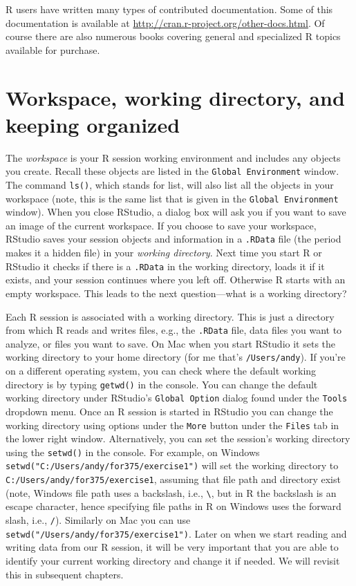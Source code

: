 R users have written many types of contributed documentation. Some of this documentation is available at \url{http://cran.r-project.org/other-docs.html}. Of course there are also numerous books covering general and specialized R topics available for purchase.

\section{Workspace, working directory, and keeping organized}

The \emph{workspace} is your R session working environment and includes any objects you create. Recall these objects are listed in the \verb+Global Environment+ window. The command \verb+ls()+, which stands for list, will also list all the objects in your workspace (note, this is the same list that is given in the \verb+Global Environment+ window). When you close RStudio, a dialog box will ask you if you want to save an image of the current workspace. If you choose to save your workspace, RStudio saves your session objects and information in a \verb+.RData+ file (the period makes it a hidden file) in your \emph{working directory}. Next time you start R or RStudio it checks if there is a \verb+.RData+ in the working directory, loads it if it exists, and your session continues where you left off. Otherwise R starts with an empty workspace. This leads to the next question---what is a working directory? 

Each R session is associated with a working directory. This is just a directory from which R reads and writes files, e.g., the \verb+.RData+ file, data files you want to analyze, or files you want to save. On Mac when you start RStudio it sets the working directory to your home directory (for me that's \verb+/Users/andy+). If you're on a different operating system, you can check where the default working directory is by typing \verb+getwd()+ in the console. You can change the default working directory under RStudio's \verb+Global Option+ dialog found under the \verb+Tools+ dropdown menu. Once an R session is started in RStudio you can change the working directory using options under the \verb+More+ button under the \verb+Files+ tab in the lower right window. Alternatively, you can set the session's working directory using the \verb+setwd()+ in the console. For example, on Windows \verb+setwd("C:/Users/andy/for375/exercise1")+ will set the working directory to \verb+C:/Users/andy/for375/exercise1+, assuming that file path and directory exist (note, Windows file path uses a backslash, i.e., \verb+\+, but in R the backslash is an escape character, hence specifying file paths in R on Windows uses the forward slash, i.e., \verb+/+). Similarly on Mac you can use \verb+setwd("/Users/andy/for375/exercise1")+. Later on when we start reading and writing data from our R session, it will be very important that you are able to identify your current working directory and change it if needed. We will revisit this in subsequent chapters.

